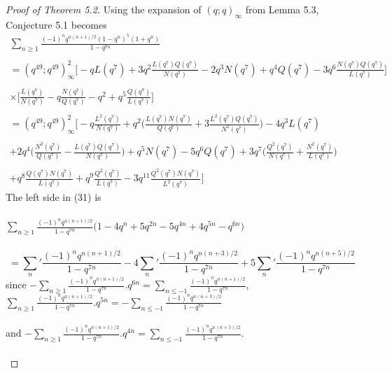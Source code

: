 \documentclass[10pt,reqno]{amsart}
\begin{document}
\begin{proof}[Proof of Theorem 5.2]
Using the expansion of $(q;q)_{\infty}$ from Lemma 5.3, Conjecture 5.1 becomes 
\begin{multline}
    \displaystyle\sum_{n\geq 1}\displaystyle\frac{(-1)^nq^{n(n+1)/2}(1-q^n)^5(1+q^n)}{1-q^{7n}}\\ \\
    =(q^{49};q^{49})_{\infty}^2\Bigg[-qL(q^7)+3q^2\displaystyle\frac{L(q^7)Q(q^7)}{N(q^7)}-2q^3N(q^7)+q^4Q(q^7)-3q^6\displaystyle\frac{N(q^7)Q(q^7)}{L(q^7)}\Bigg]\\ \\
    \times \Bigg[\displaystyle\frac{L(q^7)}{N(q^7)}-q\displaystyle\frac{N(q^7)}{Q(q^7)}-q^2+q^5\displaystyle\frac{Q(q^7)}{L(q^7)}\Bigg] \\ \\
    =(q^{49};q^{49})_{\infty}^2\Bigg[-q\displaystyle\frac{L^2(q^7)}{N(q^7)}+q^2\Bigg(\displaystyle\frac{L(q^7)N(q^7)}{Q(q^7)}+3\displaystyle\frac{L^2(q^7)Q(q^7)}{N^2(q^7)}\Bigg)-4q^3L(q^7)\\ \\
    +2q^4\Bigg(\displaystyle\frac{N^2(q^7)}{Q(q^7)}-\displaystyle\frac{L(q^7)Q(q^7)}{N(q^7)}\Bigg)+q^5N(q^7)-5q^6Q(q^7)+3q^7\Bigg(\displaystyle\frac{Q^2(q^7)}{N(q^7)}+\displaystyle\frac{N^2(q^7)}{L(q^7)}\Bigg)\\ \\
    +q^8\displaystyle\frac{Q(q^7)N(q^7)}{L(q^7)}+q^9\displaystyle\frac{Q^2(q^7)}{L(q^7)}-3q^{11}\displaystyle\frac{Q^2(q^7)N(q^7)}{L^2(q^7)}\Bigg]
\end{multline}
The left side in (31) is \\ \\$\displaystyle\sum_{n\geq 1}\displaystyle\frac{(-1)^nq^{n(n+1)/2}}{1-q^{7n}}\Bigg(1-4q^n+5q^{2n}-5q^{4n}+4q^{5n}-q^{6n}\Bigg)$\\ \\
\begin{equation} 
=\displaystyle\sum_{n}'\displaystyle\frac{(-1)^nq^{n(n+1)/2}}{1-q^{7n}}-4\displaystyle\sum_{n}'\displaystyle\frac{(-1)^nq^{n(n+3)/2}}{1-q^{7n}}+5\displaystyle\sum_{n}'\displaystyle\frac{(-1)^nq^{n(n+5)/2}}{1-q^{7n}}
\end{equation}
since $-\displaystyle\sum_{n\geq 1}\displaystyle\frac{(-1)^nq^{n(n+1)/2}}{1-q^{7n}}.q^{6n}=\displaystyle\sum_{n\leq -1}\displaystyle\frac{(-1)^nq^{n(n+1)/2}}{1-q^{7n}},$ $\displaystyle\sum_{n\geq 1}\displaystyle\frac{(-1)^nq^{n(n+1)/2}}{1-q^{7n}}.q^{5n}=-\displaystyle\sum_{n\leq -1}\displaystyle\frac{(-1)^nq^{n(n+3)/2}}{1-q^{7n}}$ \\ \\ and $-\displaystyle\sum_{n\geq 1}\displaystyle\frac{(-1)^nq^{n(n+1)/2}}{1-q^{7n}}.q^{4n}=\displaystyle\sum_{n\leq -1}\displaystyle\frac{(-1)^nq^{n(n+5)/2}}{1-q^{7n}}.$ \\ \\

\end{proof}
\end{document}
